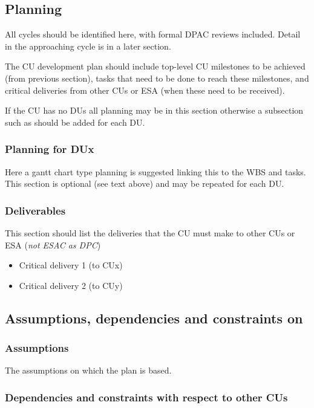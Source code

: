 \documentclass[CUx,lsstdraft,SDP]{lsstdoc}
\begin{document}
\subsection{Planning }
All cycles should be identified here, with formal DPAC reviews included.
Detail in the approaching cycle is in a later section.

The CU development plan should include top-level CU milestones to be achieved (from previous section), tasks that need to be done to reach these milestones, and critical deliveries from other CUs or ESA (when these need to be received).

If the CU has no DUs all planning may be in this section otherwise a
subsection such as  should be added for each DU.

\subsubsection{ Planning for DUx \label{sect:du1plan}}
Here a gantt chart type planning is suggested linking this to the WBS and tasks.
This section is optional (see text above) and may be repeated for each DU.

\subsubsection{Deliverables\label{sect:deliverables}}
This section should list the deliveries that the CU must make to other CUs or ESA (\textit{not ESAC as DPC})

\begin{itemize}
    \item Critical delivery 1 (to CUx)
    \item Critical delivery 2 (to CUy)
\end{itemize}

\subsection{Assumptions, dependencies and constraints on \CU  \label{sect:assumptionsdep}}

\subsubsection{Assumptions  \label{sect:assumtions}}
The assumptions on which the plan is based.

\subsubsection{ Dependencies and constraints with respect to other CUs
\label{sect:cuconstraints}}
\end{document}
